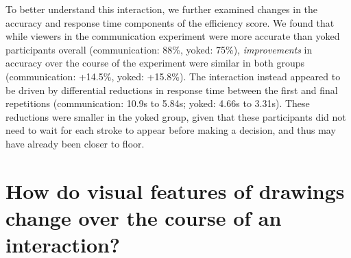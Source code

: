 To better understand this interaction, we further examined changes in the accuracy and response time components of the efficiency score.
We found that while viewers in the communication experiment were more accurate than yoked participants overall (communication: 88\%, yoked: 75\%), %
\emph{improvements} in accuracy over the course of the experiment were similar in both groups (communication: +14.5\%, yoked: +15.8\%).
The interaction instead appeared to be driven by differential reductions in response time between the first and final repetitions (communication: 10.9s to 5.84s; yoked: 4.66s to 3.31s).
These reductions were smaller in the yoked group, given that these participants did not need to wait for each stroke to appear before making a decision, and thus may have already been closer to floor.







\section{How do visual features of drawings change over the course of an interaction?}

